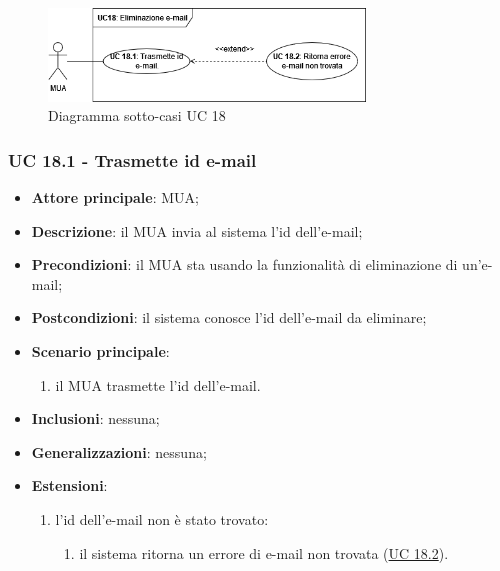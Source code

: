     \begin{figure}[H]
        \includegraphics[width=0.75\textwidth]{sections/uc_imgs/UC18.png}
        \centering
        \caption{Diagramma sotto-casi UC 18}
    \end{figure}


\subsubsection{UC 18.1 - Trasmette id e-mail} \label{sec:UC18.1}
\begin{itemize}
    \item \textbf{Attore principale}: MUA;
    \item \textbf{Descrizione}: il MUA invia al sistema l'id dell'e-mail;
    \item \textbf{Precondizioni}: il MUA sta usando la funzionalità di eliminazione di un'e-mail;
    \item \textbf{Postcondizioni}: il sistema conosce l'id dell'e-mail da eliminare;
    \item \textbf{Scenario principale}:
        \begin{enumerate}
            \item il MUA trasmette l'id dell'e-mail.
        \end{enumerate}
    \item \textbf{Inclusioni}: nessuna;
    \item \textbf{Generalizzazioni}: nessuna;
    \item \textbf{Estensioni}:
        \begin{enumerate}[label=\alph*.]
            \item l'id dell'e-mail non è stato trovato:
            \begin{enumerate}[label=\arabic*.]
                \item il sistema ritorna un errore di e-mail non trovata (\hyperref[sec:UC18.2]{UC 18.2}).
            \end{enumerate}
        \end{enumerate}
\end{itemize}


